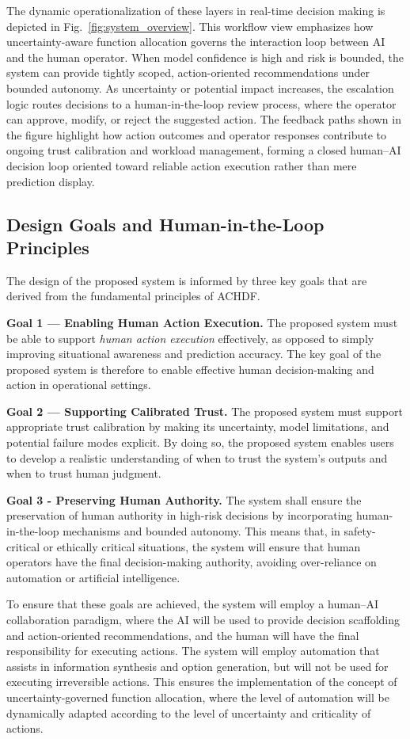 \documentclass[journal]{IEEEtran}
\theoremstyle{plain}
\theoremstyle{definition}
\begin{document}
The dynamic operationalization of these layers in real-time decision making is depicted in Fig.~\ref{fig:system_overview}. 
This workflow view emphasizes how uncertainty-aware function allocation governs the interaction loop between AI and the human operator. When model confidence is high and risk is bounded, the system can provide tightly scoped, action-oriented recommendations under bounded autonomy. As uncertainty or potential impact increases, the escalation logic routes decisions to a human-in-the-loop review process, where the operator can approve, modify, or reject the suggested action. The feedback paths shown in the figure highlight how action outcomes and operator responses contribute to ongoing trust calibration and workload management, forming a closed human--AI decision loop oriented toward reliable action execution rather than mere prediction display.

    \subsection{Design Goals and Human-in-the-Loop Principles}
    The design of the proposed system is informed by three key goals that are derived from the fundamental principles of ACHDF. 
    
    \textbf{Goal 1 — Enabling Human Action Execution.}
    The proposed system must be able to support \emph{human action execution} effectively, as opposed to simply improving situational awareness and prediction accuracy. The key goal of the proposed system is therefore to enable effective human decision-making and action in operational settings.

    \textbf{Goal 2 — Supporting Calibrated Trust.}
    The proposed system must support appropriate trust calibration by making its uncertainty, model limitations, and potential failure modes explicit. By doing so, the proposed system enables users to develop a realistic understanding of when to trust the system's outputs and when to trust human judgment.

    \textbf{Goal 3 - Preserving Human Authority.}
    The system shall ensure the preservation of human authority in high-risk decisions by incorporating human-in-the-loop mechanisms and bounded autonomy. This means that, in safety-critical or ethically critical situations, the system will ensure that human operators have the final decision-making authority, avoiding over-reliance on automation or artificial intelligence.

    To ensure that these goals are achieved, the system will employ a human--AI collaboration paradigm, where the AI will be used to provide decision scaffolding and action-oriented recommendations, and the human will have the final responsibility for executing actions. The system will employ automation that assists in information synthesis and option generation, but will not be used for executing irreversible actions. This ensures the implementation of the concept of uncertainty-governed function allocation, where the level of automation will be dynamically adapted according to the level of uncertainty and criticality of actions.
\end{document}
